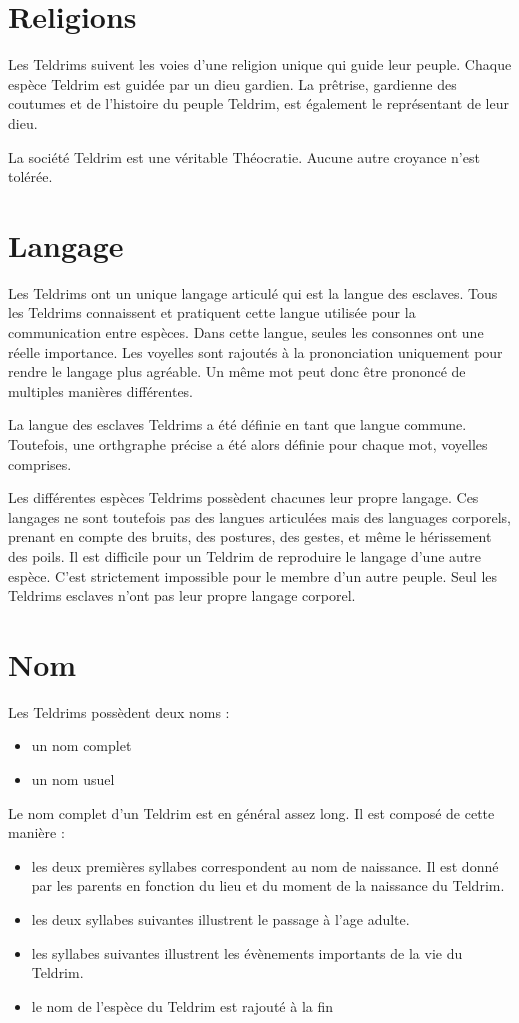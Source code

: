 \begin{multicols}{2}
\section{Religions}

Les Teldrims suivent les voies d'une religion unique qui guide leur peuple. Chaque espèce Teldrim est guidée par un dieu gardien. La prêtrise, gardienne des coutumes et de l'histoire du peuple Teldrim, est également le représentant de leur dieu.

La société Teldrim est une véritable Théocratie. Aucune autre croyance n'est tolérée.

\section{Langage}

Les Teldrims ont un unique langage articulé qui est la langue des esclaves. Tous les Teldrims connaissent et pratiquent cette langue utilisée pour la communication entre espèces. Dans cette langue, seules les consonnes ont une réelle importance. Les voyelles sont rajoutés à la prononciation uniquement pour rendre le langage plus agréable. Un même mot peut donc être prononcé de multiples manières différentes.

La langue des esclaves Teldrims a été définie en tant que langue commune. Toutefois, une orthgraphe précise a été alors définie pour chaque mot, voyelles comprises.

Les différentes espèces Teldrims possèdent chacunes leur propre langage. Ces langages ne sont toutefois pas des langues articulées mais des languages corporels, prenant en compte des bruits, des postures, des gestes, et même le hérissement des poils. Il est difficile pour un Teldrim de reproduire le langage d'une autre espèce. C'est strictement impossible pour le membre d'un autre peuple. Seul les Teldrims esclaves n'ont pas leur propre langage corporel.

\section{Nom}

Les Teldrims possèdent deux noms :
\begin{itemize}
\item un nom complet
\item un nom usuel
\end{itemize}

Le nom complet d'un Teldrim est en général assez long. Il est composé de cette manière :
\begin{itemize}
\item les deux premières syllabes correspondent au nom de naissance. Il est donné par les parents en fonction du lieu et du moment de la naissance du Teldrim.
\item les deux syllabes suivantes illustrent le passage à l'age adulte.
\item les syllabes suivantes illustrent les évènements importants de la vie du Teldrim.
\item le nom de l'espèce du Teldrim est rajouté à la fin
\end{itemize}


\end{multicols}
